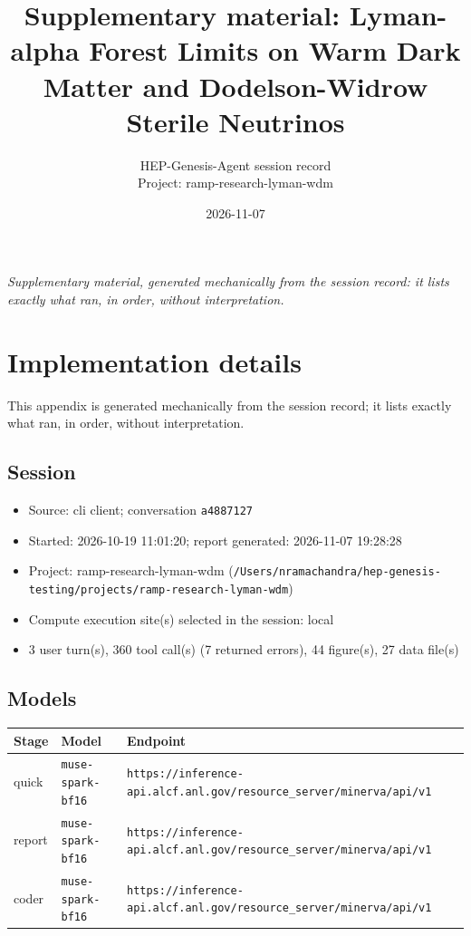 \documentclass[11pt,a4paper]{article}
\title{Supplementary material: Lyman-alpha Forest Limits on Warm Dark Matter and Dodelson-Widrow Sterile Neutrinos}
\author{HEP-Genesis-Agent session record \\ \small Project: ramp-research-lyman-wdm}
\date{2026-11-07}
\begin{document}
\maketitle
\noindent\textit{\small Supplementary material, generated mechanically from the session record: it lists exactly what ran, in order, without interpretation.}
\vspace{1em}



\appendix
\section{Implementation details}
\label{app:impl}
This appendix is generated mechanically from the session record; it lists exactly what ran, in order, without interpretation.
\subsection{Session}
\begin{itemize}
  \item Source: cli client; conversation \texttt{a4887127}
  \item Started: 2026-10-19 11:01:20; report generated: 2026-11-07 19:28:28
  \item Project: ramp-research-lyman-wdm (\texttt{/\allowbreak{}Users/\allowbreak{}nramachandra/\allowbreak{}hep-genesis-testing/\allowbreak{}projects/\allowbreak{}ramp-research-lyman-wdm})
  \item Compute execution site(s) selected in the session: local
  \item 3 user turn(s), 360 tool call(s) (7 returned errors), 44 figure(s), 27 data file(s)
\end{itemize}
\subsection{Models}
\begin{longtable}{@{}p{}p{}p{}@{}}
\toprule Stage & Model & Endpoint \\ \midrule \endhead
quick & \texttt{muse-spark-bf16} & \texttt{https:\allowbreak{}/\allowbreak{}/\allowbreak{}inference-api.alcf.anl.gov/\allowbreak{}resource\_\allowbreak{}server/\allowbreak{}minerva/\allowbreak{}api/\allowbreak{}v1} \\
report & \texttt{muse-spark-bf16} & \texttt{https:\allowbreak{}/\allowbreak{}/\allowbreak{}inference-api.alcf.anl.gov/\allowbreak{}resource\_\allowbreak{}server/\allowbreak{}minerva/\allowbreak{}api/\allowbreak{}v1} \\
coder & \texttt{muse-spark-bf16} & \texttt{https:\allowbreak{}/\allowbreak{}/\allowbreak{}inference-api.alcf.anl.gov/\allowbreak{}resource\_\allowbreak{}server/\allowbreak{}minerva/\allowbreak{}api/\allowbreak{}v1} \\
\bottomrule\end{longtable}
\end{document}

